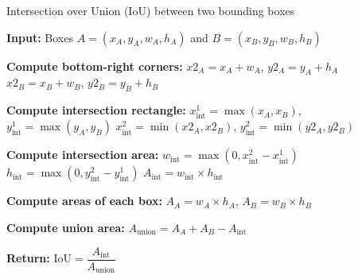 \begin{algorithm}
    \caption{Intersection over Union (IoU) between two bounding boxes}
    \begin{algorithmic}[1]
        \State \textbf{Input:} Boxes $A = (x_A, y_A, w_A, h_A)$ and $B = (x_B, y_B, w_B, h_B)$
        
        \State \textbf{Compute bottom-right corners:}
        \Statex \hspace{\algorithmicindent} $x2_A = x_A + w_A$, \quad $y2_A = y_A + h_A$
        \Statex \hspace{\algorithmicindent} $x2_B = x_B + w_B$, \quad $y2_B = y_B + h_B$
        
        \State \textbf{Compute intersection rectangle:}
        \Statex \hspace{\algorithmicindent} $x_{\text{int}}^{1} = \max(x_A, x_B)$, \quad $y_{\text{int}}^{1} = \max(y_A, y_B)$
        \Statex \hspace{\algorithmicindent} $x_{\text{int}}^{2} = \min(x2_A, x2_B)$, \quad $y_{\text{int}}^{2} = \min(y2_A, y2_B)$

        \State \textbf{Compute intersection area:}
        \Statex \hspace{\algorithmicindent} $w_{\text{int}} = \max(0, x_{\text{int}}^{2} - x_{\text{int}}^{1})$
        \Statex \hspace{\algorithmicindent} $h_{\text{int}} = \max(0, y_{\text{int}}^{2} - y_{\text{int}}^{1})$
        \Statex \hspace{\algorithmicindent} $A_{\text{int}} = w_{\text{int}} \times h_{\text{int}}$
        
        \State \textbf{Compute areas of each box:}
        \Statex \hspace{\algorithmicindent} $A_A = w_A \times h_A$, \quad $A_B = w_B \times h_B$
        
        \State \textbf{Compute union area:}
        \Statex \hspace{\algorithmicindent} $A_{\text{union}} = A_A + A_B - A_{\text{int}}$
        
        \State \textbf{Return:} $\text{IoU} = \dfrac{A_{\text{int}}}{A_{\text{union}}}$
    \end{algorithmic}
\end{algorithm}

